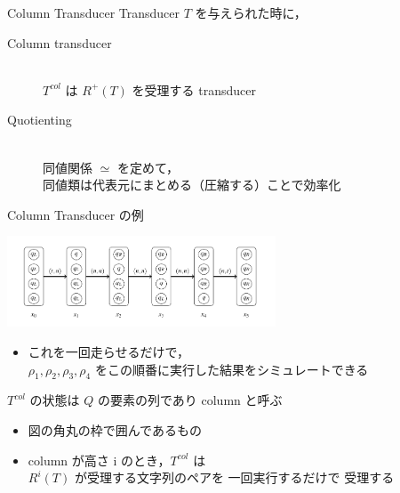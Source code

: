 \documentclass[presentation, xetex]{beamer}
\begin{document}
\begin{frame}[label={sec:orge6f662f}]{Column Transducer}
Transducer \(T\) を与えられた時に，
\begin{description}
\item[{Column transducer}] \mbox{}\\
\(T^{col}\) は \(R^+(T)\) を受理する transducer
\item[{Quotienting}] \mbox{} \\
同値関係 \(\simeq\) を定めて， \\
同値類は代表元にまとめる（圧縮する）ことで効率化
\end{description}
\end{frame}


\begin{frame}[label={sec:orgc03602b}]{Column Transducer の例}
\begin{center}
\includegraphics[width=0.6\textwidth]{./images/column-transducer.png}
\end{center}

\begin{itemize}
\item これを一回走らせるだけで， \\
\(\rho_1, \rho_2, \rho_3, \rho_4\) をこの順番に実行した結果をシミュレートできる
\end{itemize}


\(T^{col}\) の状態は \(Q\) の要素の列であり column と呼ぶ
\begin{itemize}
\item 図の角丸の枠で囲んであるもの
\item column が高さ i のとき，\(T^{col}\) は \\
\(R^i(T)\) が受理する文字列のペアを \alert{\alert{一回実行するだけで}} 受理する
\end{itemize}
\end{frame}
\end{document}
